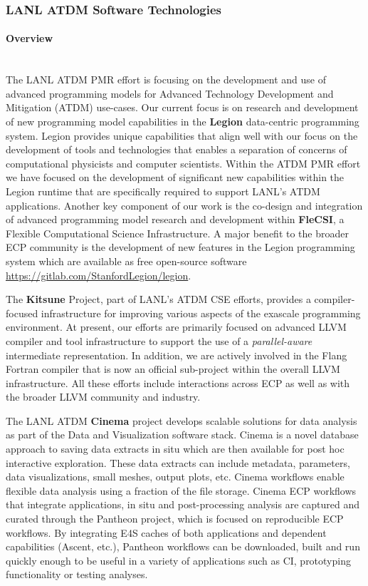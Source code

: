 \subsubsection{ LANL ATDM Software Technologies}

\paragraph{Overview} \leavevmode \\

The LANL ATDM PMR effort is focusing on the development and use of
advanced programming models for Advanced Technology Development and
Mitigation (ATDM) use-cases. Our current focus is on research and development
of new programming model capabilities in the \textbf{Legion} data-centric
programming system. Legion provides unique capabilities that align
well with our focus on the development of tools and technologies that
enables a separation of concerns of computational physicists and
computer scientists. Within the ATDM PMR effort we have focused on the
development of significant new capabilities within the Legion runtime
that are specifically required to support LANL's ATDM
applications. Another key component of our work is the co-design and
integration of advanced programming model research and development
within \textbf{FleCSI}, a Flexible Computational Science Infrastructure. A
major benefit to the broader ECP community is the development of new 
features in the Legion programming system which are available as free
open-source software \url{https://gitlab.com/StanfordLegion/legion}.  

The \textbf{Kitsune} Project, part of LANL's ATDM CSE efforts, provides a
compiler-focused infrastructure for improving various aspects of the
exascale programming environment.  At present, our efforts are primarily
focused on advanced LLVM compiler and tool infrastructure to support the
use of a \emph{parallel-aware} intermediate representation.  In
addition, we are actively involved in the Flang Fortran compiler that
is now an official sub-project within the overall LLVM infrastructure.
All these efforts include interactions across ECP as well as
with the broader LLVM community and industry.  


The LANL ATDM \textbf{Cinema} project develops scalable solutions for data analysis as part of the Data and Visualization software stack.
Cinema is a novel database approach to saving data extracts in situ which are then available for post hoc interactive exploration.  These data extracts can include metadata, parameters, data visualizations, small meshes, output plots, etc.  Cinema workflows enable flexible data analysis using a fraction of the file storage.  Cinema ECP workflows that integrate applications, in situ and post-processing analysis are captured and curated through the Pantheon project, which is focused on reproducible ECP workflows.  By integrating E4S caches of both applications and dependent capabilities (Ascent, etc.), Pantheon workflows can be downloaded, built and run quickly enough to be useful in a variety of applications such as CI, prototyping functionality or testing analyses.  

